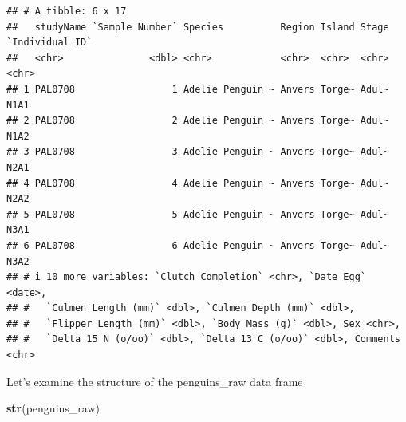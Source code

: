 \documentclass[
]{book}
\newenvironment{Shaded}{\begin{snugshade}}{\end{snugshade}}
\newcommand{\FunctionTok}[1]{\textcolor[rgb]{0.13,0.29,0.53}{\textbf{#1}}}
\newcommand{\NormalTok}[1]{#1}
\begin{document}
\begin{verbatim}
## # A tibble: 6 x 17
##   studyName `Sample Number` Species          Region Island Stage `Individual ID`
##   <chr>               <dbl> <chr>            <chr>  <chr>  <chr> <chr>          
## 1 PAL0708                 1 Adelie Penguin ~ Anvers Torge~ Adul~ N1A1           
## 2 PAL0708                 2 Adelie Penguin ~ Anvers Torge~ Adul~ N1A2           
## 3 PAL0708                 3 Adelie Penguin ~ Anvers Torge~ Adul~ N2A1           
## 4 PAL0708                 4 Adelie Penguin ~ Anvers Torge~ Adul~ N2A2           
## 5 PAL0708                 5 Adelie Penguin ~ Anvers Torge~ Adul~ N3A1           
## 6 PAL0708                 6 Adelie Penguin ~ Anvers Torge~ Adul~ N3A2           
## # i 10 more variables: `Clutch Completion` <chr>, `Date Egg` <date>,
## #   `Culmen Length (mm)` <dbl>, `Culmen Depth (mm)` <dbl>,
## #   `Flipper Length (mm)` <dbl>, `Body Mass (g)` <dbl>, Sex <chr>,
## #   `Delta 15 N (o/oo)` <dbl>, `Delta 13 C (o/oo)` <dbl>, Comments <chr>
\end{verbatim}

Let's examine the structure of the penguins\_raw data frame

\begin{Shaded}
\begin{Highlighting}[]
\FunctionTok{str}\NormalTok{(penguins\_raw)}
\end{Highlighting}
\end{Shaded}
\end{document}
